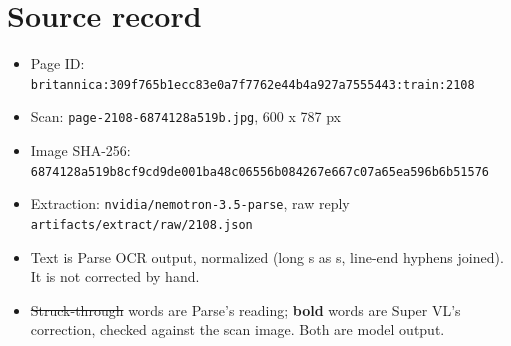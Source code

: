 \documentclass[10pt]{article}
\begin{document}
\section*{Source record}
\begin{itemize}
\item Page ID: \texttt{britannica:309f765b1ecc83e0a7f7762e44b4a927a7555443:train:2108}
\item Scan: \texttt{page-2108-6874128a519b.jpg}, 600 x 787 px
\item Image SHA-256: \texttt{\small 6874128a519b8cf9cd9de001ba48c06556b084267e667c07a65ea596b6b51576}
\item Extraction: \texttt{nvidia/nemotron-3.5-parse}, raw reply \texttt{artifacts/extract/raw/2108.json}
\item Text is Parse OCR output, normalized (long s as s, line-end hyphens joined). It is not corrected by hand.
\item \sout{Struck-through} words are Parse's reading; \textbf{bold} words are Super VL's correction, checked against the scan image. Both are model output.
\end{itemize}
\end{document}

